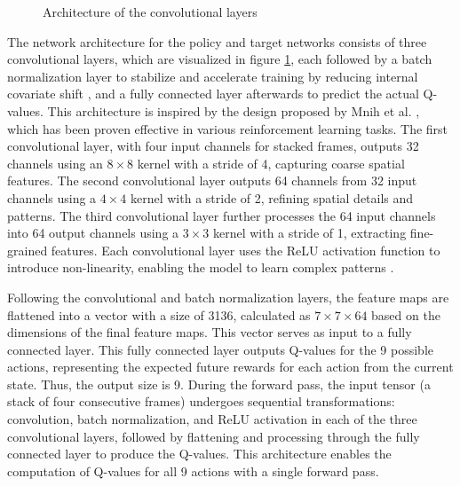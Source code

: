 \begin{figure}[!h]

\caption{Architecture of the convolutional layers}
\label{fig: CNN}
\end{figure}

The network architecture for the policy and target networks consists of three convolutional layers, which are visualized in figure \ref{fig: CNN}, each followed by a batch normalization layer to stabilize and accelerate training by reducing internal covariate shift \cite{ioffe2015batch}, and a fully connected layer afterwards to predict the actual Q-values. This architecture is inspired by the design proposed by Mnih et al. \cite{mnih2013playingatarideepreinforcement}, which has been proven effective in various reinforcement learning tasks. The first convolutional layer, with four input channels for stacked frames, outputs 32 channels using an $8\times8$ kernel with a stride of 4, capturing coarse spatial features. The second convolutional layer outputs 64 channels from 32 input channels using a $4\times4$ kernel with a stride of 2, refining spatial details and patterns. The third convolutional layer further processes the 64 input channels into 64 output channels using a $3\times3$ kernel with a stride of 1, extracting fine-grained features. Each convolutional layer uses the ReLU activation function to introduce non-linearity, enabling the model to learn complex patterns \cite{nair2010rectified}.

Following the convolutional and batch normalization layers, the feature maps are flattened into a vector with a size of 3136, calculated as $7\times7\times64$ based on the dimensions of the final feature maps. This vector serves as input to a fully connected layer. This fully connected layer outputs Q-values for the 9 possible actions, representing the expected future rewards for each action from the current state. Thus, the output size is 9. During the forward pass, the input tensor (a stack of four consecutive frames) undergoes sequential transformations: convolution, batch normalization, and ReLU activation in each of the three convolutional layers, followed by flattening and processing through the fully connected layer to produce the Q-values. This architecture enables the computation of Q-values for all 9 actions with a single forward pass.

